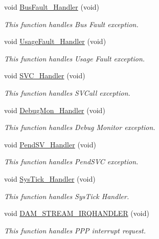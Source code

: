 \begin{DoxyCompactItemize}
void \hyperlink{group___d_m_a___f_l_a_s_h___r_a_m_ga850cefb17a977292ae5eb4cafa9976c3}{Bus\-Fault\-\_\-\-Handler} (void)
\begin{DoxyCompactList}\small\item\em This function handles Bus Fault exception. \end{DoxyCompactList}\item 
void \hyperlink{group___d_m_a___f_l_a_s_h___r_a_m_ga1d98923de2ed6b7309b66f9ba2971647}{Usage\-Fault\-\_\-\-Handler} (void)
\begin{DoxyCompactList}\small\item\em This function handles Usage Fault exception. \end{DoxyCompactList}\item 
void \hyperlink{group___d_m_a___f_l_a_s_h___r_a_m_ga3e5ddb3df0d62f2dc357e64a3f04a6ce}{S\-V\-C\-\_\-\-Handler} (void)
\begin{DoxyCompactList}\small\item\em This function handles S\-V\-Call exception. \end{DoxyCompactList}\item 
void \hyperlink{group___d_m_a___f_l_a_s_h___r_a_m_gadbdfb05858cc36fc520974df37ec3cb0}{Debug\-Mon\-\_\-\-Handler} (void)
\begin{DoxyCompactList}\small\item\em This function handles Debug Monitor exception. \end{DoxyCompactList}\item 
void \hyperlink{group___d_m_a___f_l_a_s_h___r_a_m_ga6303e1f258cbdc1f970ce579cc015623}{Pend\-S\-V\-\_\-\-Handler} (void)
\begin{DoxyCompactList}\small\item\em This function handles Pend\-S\-V\-C exception. \end{DoxyCompactList}\item 
void \hyperlink{group___d_m_a___f_l_a_s_h___r_a_m_gab5e09814056d617c521549e542639b7e}{Sys\-Tick\-\_\-\-Handler} (void)
\begin{DoxyCompactList}\small\item\em This function handles Sys\-Tick Handler. \end{DoxyCompactList}\item 
void \hyperlink{group___d_m_a___f_l_a_s_h___r_a_m_ga4b76f77c8e92e439b2e061fbe0d897fc}{D\-A\-M\-\_\-\-S\-T\-R\-E\-A\-M\-\_\-\-I\-R\-Q\-H\-A\-N\-D\-L\-E\-R} (void)
\begin{DoxyCompactList}\small\item\em This function handles P\-P\-P interrupt request. \end{DoxyCompactList}\end{DoxyCompactItemize}
